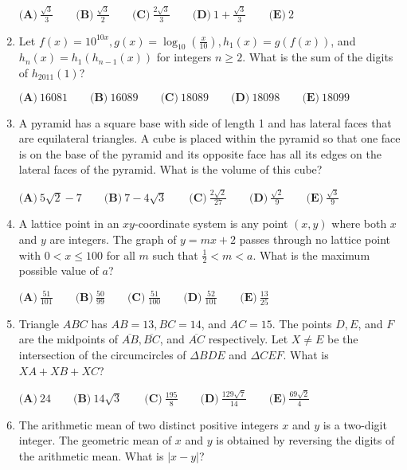 \documentclass{article}
\begin{document}
\begin{enumerate}[label=\arabic*., itemsep=0.5em]
\(\textbf{(A)}\ \frac{\sqrt{3}}{3} \qquad \textbf{(B)}\ \frac{\sqrt{3}}{2} \qquad \textbf{(C)}\ \frac{2\sqrt{3}}{3} \qquad \textbf{(D)}\ 1 + \frac{\sqrt{3}}{3} \qquad \textbf{(E)}\ 2\)\par \vspace{0.5em}\item Let \(f(x) = 10^{10x}, g(x) = \log_{10}\left(\frac{x}{10}\right), h_1(x) = g(f(x))\), and \(h_n(x) = h_1(h_{n-1}(x))\) for integers \(n \geq 2\). What is the sum of the digits of \(h_{2011}(1)\)?

\(\textbf{(A)}\ 16081 \qquad \textbf{(B)}\ 16089 \qquad \textbf{(C)}\ 18089 \qquad \textbf{(D)}\ 18098 \qquad \textbf{(E)}\ 18099\)\par \vspace{0.5em}\item A pyramid has a square base with side of length 1 and has lateral faces that are equilateral triangles. A cube is placed within the pyramid so that one face is on the base of the pyramid and its opposite face has all its edges on the lateral faces of the pyramid. What is the volume of this cube?

\(\textbf{(A)}\ 5\sqrt{2} - 7 \qquad \textbf{(B)}\ 7 - 4\sqrt{3} \qquad \textbf{(C)}\ \frac{2\sqrt{2}}{27} \qquad \textbf{(D)}\ \frac{\sqrt{2}}{9} \qquad \textbf{(E)}\ \frac{\sqrt{3}}{9}\)\par \vspace{0.5em}\item A lattice point in an \(xy\)-coordinate system is any point \((x, y)\) where both \(x\) and \(y\) are integers. The graph of \(y = mx + 2\) passes through no lattice point with \(0 < x \leq 100\) for all \(m\) such that \(\frac{1}{2} < m < a\). What is the maximum possible value of \(a\)?

\(\textbf{(A)}\ \frac{51}{101} \qquad \textbf{(B)}\ \frac{50}{99} \qquad \textbf{(C)}\ \frac{51}{100} \qquad \textbf{(D)}\ \frac{52}{101} \qquad \textbf{(E)}\ \frac{13}{25}\)\par \vspace{0.5em}\item Triangle \(ABC\) has \(AB = 13, BC = 14\), and \(AC = 15\). The points \(D, E\), and \(F\) are the midpoints of \(\overline{AB}, \overline{BC}\), and \(\overline{AC}\) respectively. Let \(X \not= E\) be the intersection of the circumcircles of \(\Delta BDE\) and \(\Delta CEF\). What is \(XA + XB + XC\)?

\(\textbf{(A)}\ 24 \qquad \textbf{(B)}\ 14\sqrt{3} \qquad \textbf{(C)}\ \frac{195}{8} \qquad \textbf{(D)}\ \frac{129\sqrt{7}}{14} \qquad \textbf{(E)}\ \frac{69\sqrt{2}}{4}\)\par \vspace{0.5em}\item The arithmetic mean of two distinct positive integers \(x\) and \(y\) is a two-digit integer. The geometric mean of \(x\) and \(y\) is obtained by reversing the digits of the arithmetic mean. What is \(|x - y|\)?


\end{enumerate}
\end{document}

